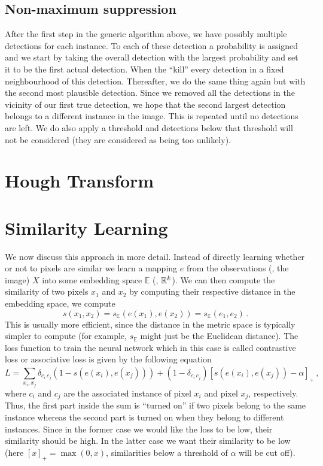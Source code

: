 \subsection*{Non-maximum suppression}
After the first step in the generic algorithm above, we have possibly multiple
detections for each instance. To each of these detection a probability is
assigned and we start by taking the overall detection with the largest
probability and set it to be the first actual detection. When the ``kill'' every
detection in a fixed neighbourhood of this detection. Thereafter, we do the same
thing again but with the second most plausible detection. Since we removed all
the detections in the vicinity of our first true detection, we hope that the
second largest detection belongs to a different instance in the image. This is
repeated until no detections are left. We do also apply a threshold and
detections below that threshold will not be considered (they are considered as
being too unlikely).

\section{Hough Transform}
\section{Similarity Learning}
%
We now discuss this approach in more detail. Instead of directly learning
whether or not to pixels are similar we learn a mapping $e$ from the
observations (\ie, the image) $X$ into some embedding space $\mathbb{E}$ (\eg,
$\mathbb{R}^k$). We can then compute the similarity of two pixels $x_1$ and $x_2$ by
computing their respective distance in the embedding space, \ie we compute
\begin{equation*}
  s(x_1,x_2) = s_{\mathbb{E}}(e(x_1),e(x_2)) = s_{\mathbb{E}}(e_1,e_2)\,.
\end{equation*}
This is usually more efficient, since the distance in the metric space is
typically simpler to compute (for example, $s_{\mathbb{E}}$ might just be the
Euclidean distance). The loss function to train the neural network which in this
case is called contrastive loss or associative loss is given by the following
equation
\begin{equation*}
  L = \sum_{x_i,x_j} \delta_{c_i\,c_j}(1 - s(e(x_i), e(x_j))) + (1 - \delta_{c_i\,c_j}){[s(e(x_i),e(x_j)) - \alpha]}_+\,,
\end{equation*}
where $c_i$ and $c_j$ are the associated instance of pixel $x_i$ and pixel
$x_j$, respectively. Thus, the first part inside the sum is ``turned on'' if two
pixels belong to the same instance whereas the second part is turned on when
they belong to different instances. Since in the former case we would like the
loss to be low, \ie their similarity should be high. In the latter case we want
their similarity to be low (here ${[x]}_+ = \max(0,x)$, \ie similarities below a
threshold of $\alpha$ will be cut off).


